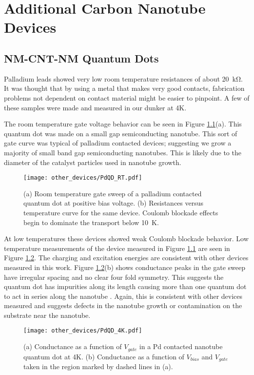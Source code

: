 \chapter{Additional Carbon Nanotube Devices}
\label{sec:other_devices}

\section{NM-CNT-NM Quantum Dots}

Palladium leads showed very low room temperature resistances of about \SI{20}{\kilo\ohm}. It was thought that by using a metal that makes very good contacts, fabrication problems not dependent on contact material might be easier to pinpoint. A few of these samples were made and measured in our dunker at 4K. 

The room temperature gate voltage behavior can be seen in Figure \ref{fig:PdQD_rt}(a). This quantum dot was made on a small gap semiconducting nanotube. This sort of gate curve was typical of palladium contacted devices; suggesting we grow a majority of small band gap semiconducting nanotubes. This is likely due to the diameter of the catalyst particles used in nanotube growth.

\begin{figure}
    \centering
    \texttt{[image: other\_devices/PdQD\_RT.pdf]}
    \caption{(a) Room temperature gate sweep of a palladium contacted quantum dot at positive bias voltage. (b) Resistances versus temperature curve for the same device. Coulomb blockade effects begin to dominate the transport below \SI{10}{\kelvin}.}
    \label{fig:PdQD_rt}
\end{figure}

At low temperatures these devices showed weak Coulomb blockade behavior. Low temperature measurements of the device measured in Figure \ref{fig:PdQD_rt} are seen in Figure \ref{fig:PdQD_4K}. The charging and excitation energies are consistent with other devices measured in this work. Figure \ref{fig:PdQD_4K}(b) shows conductance peaks in the gate sweep have irregular spacing and no clear four fold symmetry. This suggests the quantum dot has impurities along its length causing more than one quantum dot to act in series along the nanotube \cite{Bockrath2001}. Again, this is consistent with other devices measured and suggests defects in the nanotube growth or contamination on the substrate near the nanotube.

\begin{figure}
    \centering
    \texttt{[image: other\_devices/PdQD\_4K.pdf]}
    \caption{(a) Conductance as a function of $V_{gate}$ in a Pd contacted nanotube quantum dot at 4K. (b) Conductance as a function of $V_{bias}$ and $V_{gate}$ taken in the region marked by dashed lines in (a).}
    \label{fig:PdQD_4K}
\end{figure}

